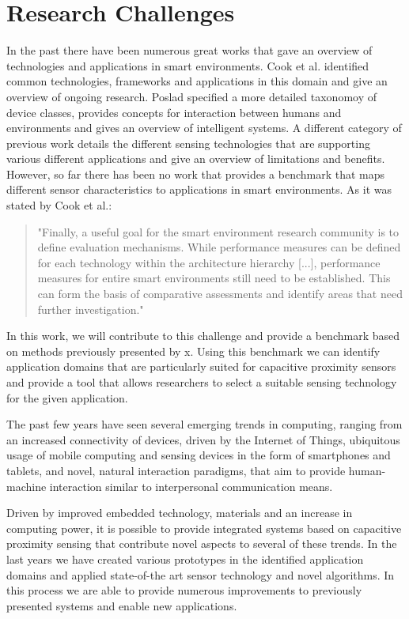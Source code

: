 \section{Research Challenges}
In the past there have been numerous great works that gave an overview of technologies and applications in smart environments. Cook et al. identified common technologies, frameworks and applications in this domain and give an overview of ongoing research. Poslad specified a more detailed taxonomoy of device classes, provides concepts for interaction between humans and environments and gives an overview of intelligent systems. A different category  of previous work details the different sensing technologies that are supporting various different applications and give an overview of limitations and benefits. However, so far there has been no work that provides a benchmark that maps different sensor characteristics to applications in smart environments. As it was stated by Cook et al.:
\begin{quote}
"Finally, a useful goal for the smart environment research community is to define evaluation mechanisms. While performance measures can be defined for each technology within the architecture hierarchy [...], performance measures for entire smart environments still need to be established. This can form the basis of comparative assessments and identify areas that need further investigation."
\end{quote}
In this work, we will contribute to this challenge and provide a benchmark based on methods previously presented by x. Using this benchmark we can identify application domains that are particularly suited for capacitive proximity sensors and provide a tool that allows researchers to select a suitable sensing technology for the given application.

The past few years have seen several emerging trends in computing, ranging from an increased connectivity of devices, driven by the Internet of Things, ubiquitous usage of mobile computing and sensing devices in the form of smartphones and tablets, and novel, natural interaction paradigms, that aim to provide human-machine interaction similar to interpersonal communication means. 

Driven by improved embedded technology, materials and an increase in computing power, it is possible to provide integrated systems based on capacitive proximity sensing that contribute novel aspects to several of these trends. In the last years we have created various prototypes in the identified application domains and applied state-of-the art sensor technology and novel algorithms. In this process we are able to provide numerous improvements to previously presented systems and enable new applications. 

